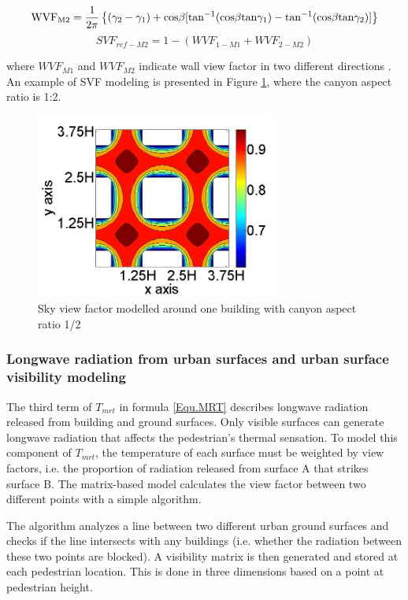 \documentclass[preprint,3p,12pt,english]{elsarticle}
\begin{document}
\begin{equation}
\rm
WVF_{M2}=\frac{1}{2\pi}
\left\{
(\gamma_2-\gamma_1)+cos{\beta}[tan^{-1}(cos{\beta}tan{\gamma_1})-tan^{-1}(cos{\beta}tan\gamma_2)]
\right\}
\end{equation}
\begin{equation}
SVF_{ref-M2}=1-(WVF_{1-M1}+WVF_{2-M2})
\end{equation}

where $WVF_{M1}$ and $WVF_{M2}$ indicate wall view factor in two different directions \cite{wu2013calculation}. An example of SVF modeling is presented in Figure \ref{Fig.SVFexample}, where the canyon aspect ratio is 1:2. 

\begin{figure}[H]
\graphicspath{ {image/} }
\centerline{\includegraphics[width=8cm]{SVFSample.jpg}}
\caption{Sky view factor modelled around one building with canyon aspect ratio 1/2}
\label{Fig.SVFexample}
\end{figure}



\subsubsection{Longwave radiation from urban surfaces and urban surface visibility modeling}

The third term of $T_{mrt}$ in formula \ref{Equ.MRT} describes longwave radiation  released from building and ground surfaces. Only visible surfaces can generate longwave radiation that affects the pedestrian's thermal sensation. To model this component of $T_{mrt}$, the temperature of each surface must be weighted by view factors, i.e. the proportion of radiation released from surface A that strikes surface B. The matrix-based model calculates the view factor between two different points with a simple algorithm.

The algorithm analyzes a line between two different urban ground surfaces and checks if the line intersects with any buildings (i.e. whether the radiation between these two points are blocked). A visibility matrix is then generated and stored at each pedestrian location. This is done in three dimensions based on a point at pedestrian height. 
\end{document}
